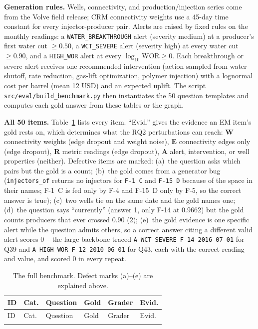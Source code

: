 \documentclass{article}
\begin{document}
\textbf{Generation rules.} Wells, connectivity, and production/injection
series come from the Volve field release; CRM connectivity weights use a
45-day time constant for every injector-producer pair. Alerts are raised by
fixed rules on the monthly readings: a \texttt{WATER\_BREAKTHROUGH} alert
(severity medium) at a producer's first water cut $\geq 0.50$, a
\texttt{WCT\_SEVERE} alert (severity high) at every water cut $\geq 0.90$, and
a \texttt{HIGH\_WOR} alert at every $\log_{10}\mathrm{WOR} \geq 0$. Each
breakthrough or severe alert receives one recommended intervention (action
sampled from water shutoff, rate reduction, gas-lift optimization, polymer
injection) with a lognormal cost per barrel (mean 12 USD) and an expected
uplift. The script \texttt{src/eval/build\_benchmark.py} then instantiates the
50 question templates and computes each gold answer from these tables or the
graph.

\textbf{All 50 items.} Table~\ref{tab:bench} lists every item. ``Evid.'' gives
the evidence an EM item's gold rests on, which determines what the RQ2
perturbations can reach: \textbf{W} connectivity weights (edge dropout and
weight noise), \textbf{E} connectivity edges only (edge dropout),
\textbf{R} metric readings (edge dropout), \textbf{A} alert, intervention, or
well properties (neither). Defective items are marked: (a)~the question asks
which pairs but the gold is a count; (b)~the gold comes from a generator bug
(\texttt{injectors\_of} returns no injectors for \texttt{F-1~C} and
\texttt{F-15~D} because of the space in their names; F-1~C is fed only by F-4
and F-15~D only by F-5, so the correct answer is true); (c)~two wells tie on
the same date and the gold names one; (d)~the question says ``currently''
(answer 1, only F-14 at 0.9662) but the gold counts producers that ever
crossed 0.90 (2); (e)~the gold evidence is one specific alert while the
question admits others, so a correct answer citing a different valid alert
scores 0 -- the large backbone traced \texttt{A\_WCT\_SEVERE\_F-14\_2016-07-01}
for Q39 and \texttt{A\_HIGH\_WOR\_F-12\_2010-06-01} for Q43, each with the
correct reading and value, and scored 0 in every repeat.

{\footnotesize
\setlength{\tabcolsep}{3pt}
\begin{longtable}{@{}>{\raggedright\arraybackslash}p{}%
>{\raggedright\arraybackslash}p{}%
>{\raggedright\arraybackslash}p{}%
>{\raggedright\arraybackslash}p{}%
>{\raggedright\arraybackslash}p{}%
>{\raggedright\arraybackslash}p{}@{}}
\caption{The full benchmark. Defect marks (a)--(e) are explained above.}
\label{tab:bench}\\
\toprule
ID & Cat. & Question & Gold & Grader & Evid. \\
\midrule
\endfirsthead
\toprule
ID & Cat. & Question & Gold & Grader & Evid. \\
\midrule
\endhead
\bottomrule
\endfoot

\end{longtable}
}
\end{document}
